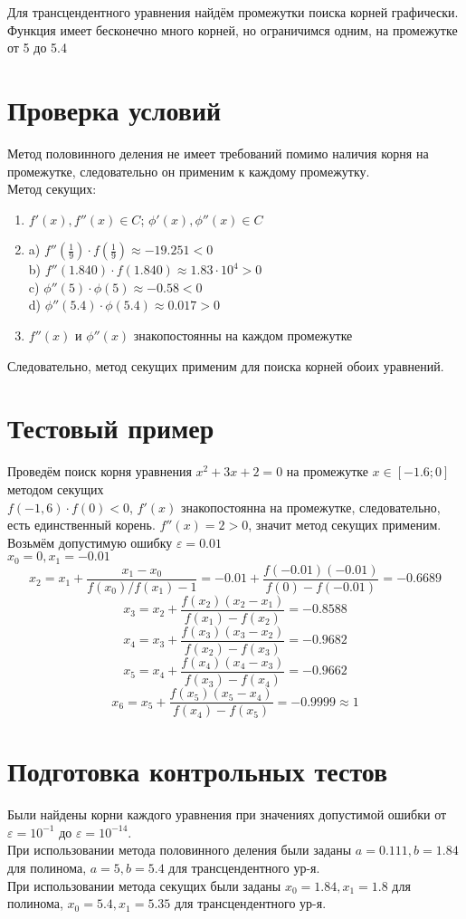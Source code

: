\documentclass[a4paper]{article}
\let\epsilon\varepsilon
\begin{document}
Для трансцендентного уравнения найдём промежутки поиска корней графически.\\
Функция имеет бесконечно много корней, но ограничимся одним, на промежутке от 5 до 5.4\\
\section{Проверка условий}
Метод половинного деления не имеет требований помимо наличия корня на промежутке, следовательно он применим к каждому промежутку.\\
Метод секущих:\\
\begin{enumerate}
  \item $f'(x),f''(x) \in C$; $\phi'(x),\phi''(x) \in C$
  \item a) $f''(\frac{1}{9})\cdot f(\frac{1}{9}) \approx -19.251 <0$\\
        b) $f''(1.840)\cdot f(1.840) \approx 1.83\cdot10^{4} > 0$\\
        c) $\phi''(5) \cdot \phi(5) \approx -0.58 < 0$\\
        d) $\phi''(5.4) \cdot \phi(5.4) \approx 0.017 > 0$
  \item $f''(x)$ и $\phi''(x)$ знакопостоянны на каждом промежутке
\end{enumerate}
Следовательно, метод секущих применим для поиска корней обоих уравнений.
\section{Тестовый пример}
Проведём поиск корня уравнения $x^{2}+3x+2=0$ на промежутке $x \in [-1.6;0]$ методом секущих\\
$f(-1,6)\cdot f(0) <0$, $f'(x)$ знакопостоянна на промежутке, следовательно, есть единственный корень.
$f''(x)=2 > 0$, значит метод секущих применим. Возьмём допустимую ошибку $\epsilon = 0.01$\\
$x_{0} =0, x_{1} = -0.01$\\
\[
  x_{2} = x_{1} + \frac{x_{1}-x_{0}}{f(x_{0})/f(x_{1}) -1} = -0.01 + \frac{f(-0.01)(-0.01)}{f(0)-f(-0.01)} = -0.6689
\]\[
  x_{3} = x_{2} + \frac{f(x_{2})(x_{2}-x_{1})}{f(x_{1})-f(x_{2})} = -0.8588
\]\[
  x_{4} = x_{3} + \frac{f(x_{3})(x_{3}-x_{2})}{f(x_{2})-f(x_{3})} = -0.9682
\]\[
  x_{5} = x_{4} + \frac{f(x_{4})(x_{4}-x_{3})}{f(x_{3})-f(x_{4})} = -0.9662
\]\[
  x_{6} = x_{5} + \frac{f(x_{5})(x_{5}-x_{4})}{f(x_{4})-f(x_{5})} = -0.9999 \approx 1
\]
\section{Подготовка контрольных тестов}
Были найдены корни каждого уравнения при значениях допустимой ошибки от $\epsilon = 10^{-1}$ до $\epsilon = 10^{-14}$.\\
При использовании метода половинного деления были заданы $a = 0.111, b=1.84$ для полинома, $a = 5, b = 5.4$ для трансцендентного ур-я.\\
При использовании метода секущих были заданы $x_{0}=1.84, x_{1}=1.8$ для полинома, $x_{0}=5.4, x_{1}=5.35$ для трансцендентного ур-я.
\end{document}
